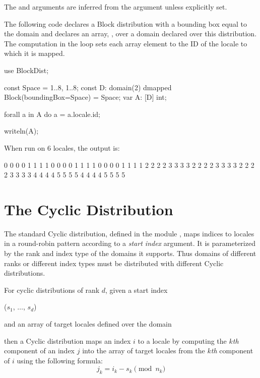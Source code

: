 The  and  arguments are inferred from the
 argument unless explicitly set.

\begin{example}
The following code declares a Block distribution with a bounding box
equal to the domain  and declares an array, , over
a domain declared over this distribution.  The computation in
the  loop sets each array element to the ID of the locale
to which it is mapped.
\begin{chapel}
use BlockDist;

const Space = {1..8, 1..8};
const D: domain(2) dmapped Block(boundingBox=Space) = Space;
var A: [D] int;

forall a in A do
  a = a.locale.id;

writeln(A);
\end{chapel}
When run on 6 locales, the output is:
\begin{chapel}
0 0 0 0 1 1 1 1
0 0 0 0 1 1 1 1
0 0 0 0 1 1 1 1
2 2 2 2 3 3 3 3
2 2 2 2 3 3 3 3
2 2 2 2 3 3 3 3
4 4 4 4 5 5 5 5
4 4 4 4 5 5 5 5
\end{chapel}
\end{example}


\section{The Cyclic Distribution}
\label{Cyclic_Dist}
The standard Cyclic distribution, defined in the
module , maps indices to locales in a round-robin
pattern according to a \emph{start index} argument.  It is
parameterized by the rank and index type of the domains it supports.
Thus domains of different ranks or different index types must be
distributed with different Cyclic distributions.

For cyclic distributions of rank $d$, given a start index
\begin{chapel}
($s_1$, $\ldots$, $s_d$)
\end{chapel}
and an array of target locales defined over the domain
\begin{chapel}
[$0$..$n_1$-1, $\ldots$, $0$..$n_d$-1]
\end{chapel}
then a Cyclic distribution maps an index $i$ to a locale by computing
the $k$\emph{th} component of an index $j$ into the array of target
locales from the $k$\emph{th} component of $i$ using the following
formula:
\[j_k = i_k - s_k \pmod{n_k}\]

